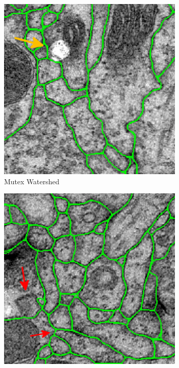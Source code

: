 \begin{figure}[htp]
\begin{subfigure}[t]{0.41 \linewidth}
        \includegraphics[width=0.98\textwidth]{figures/MWS/images/damws_1.png}
        \caption{Mutex Watershed} \label{fig:mws2}
    \end{subfigure}
    \vspace{0.3cm}
    \begin{subfigure}[t]{0.41 \linewidth}
        \centering
        \includegraphics[width=0.98\textwidth]{figures/MWS/images/mclr_2.png}

\end{subfigure}
\end{figure}
